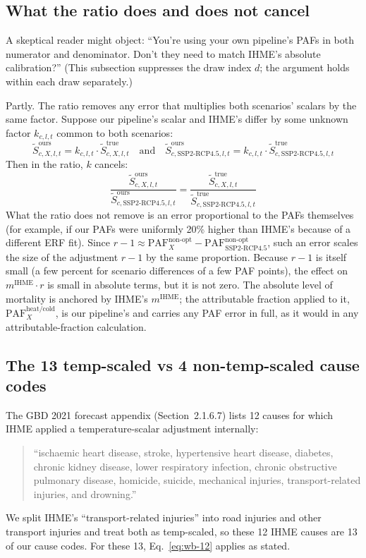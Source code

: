 \documentclass[11pt]{article}
\newcommand{\PAF}{\text{PAF}}
\newcommand{\SSPtwo}{\text{SSP2{-}RCP4.5}}
\newcommand{\mIHME}{m^{\text{IHME}}}
\begin{document}
\subsection{What the ratio does and does not cancel}

A skeptical reader might object: ``You're using your own pipeline's PAFs
in both numerator and denominator. Don't they need to match IHME's
absolute calibration?'' (This subsection suppresses the draw index $d$;
the argument holds within each draw separately.)

Partly. The ratio removes any error that multiplies both scenarios'
scalars by the same factor. Suppose our pipeline's scalar and IHME's
differ by some unknown factor $k_{c,l,t}$ common to both scenarios:
\begin{equation*}
\tilde S^{\text{ours}}_{c,X,l,t} = k_{c,l,t} \cdot \tilde S^{\text{true}}_{c,X,l,t}
\quad\text{and}\quad
\tilde S^{\text{ours}}_{c,\SSPtwo,l,t} = k_{c,l,t} \cdot \tilde S^{\text{true}}_{c,\SSPtwo,l,t}
\end{equation*}
Then in the ratio, $k$ cancels:
\begin{equation*}
\frac{\tilde S^{\text{ours}}_{c,X,l,t}}{\tilde S^{\text{ours}}_{c,\SSPtwo,l,t}}
= \frac{\tilde S^{\text{true}}_{c,X,l,t}}{\tilde S^{\text{true}}_{c,\SSPtwo,l,t}}
\end{equation*}
What the ratio does not remove is an error proportional to the PAFs
themselves (for example, if our PAFs were uniformly 20\% higher than
IHME's because of a different ERF fit). Since $r - 1 \approx
\PAF^{\text{non-opt}}_X - \PAF^{\text{non-opt}}_{\SSPtwo}$, such an error
scales the size of the adjustment $r - 1$ by the same proportion. Because
$r - 1$ is itself small (a few percent for scenario differences of a few
PAF points), the effect on $\mIHME \cdot r$ is small in absolute terms,
but it is not zero. The absolute level of mortality is anchored by
IHME's $\mIHME$; the attributable fraction applied to it,
$\PAF^{\text{heat/cold}}_X$, is our pipeline's and carries any PAF error
in full, as it would in any attributable-fraction calculation.

\subsection{The 13 temp-scaled vs 4 non-temp-scaled cause codes}

The GBD 2021 forecast appendix (Section~2.1.6.7) lists 12 causes for
which IHME applied a temperature-scalar adjustment internally:
\begin{quote}
``ischaemic heart disease, stroke, hypertensive heart disease, diabetes,
chronic kidney disease, lower respiratory infection, chronic obstructive
pulmonary disease, homicide, suicide, mechanical injuries,
transport-related injuries, and drowning.''
\end{quote}
We split IHME's ``transport-related injuries'' into road injuries and
other transport injuries and treat both as temp-scaled, so these 12 IHME
causes are 13 of our cause codes. For these 13, Eq.~\eqref{eq:wb-12}
applies as stated.
\end{document}
